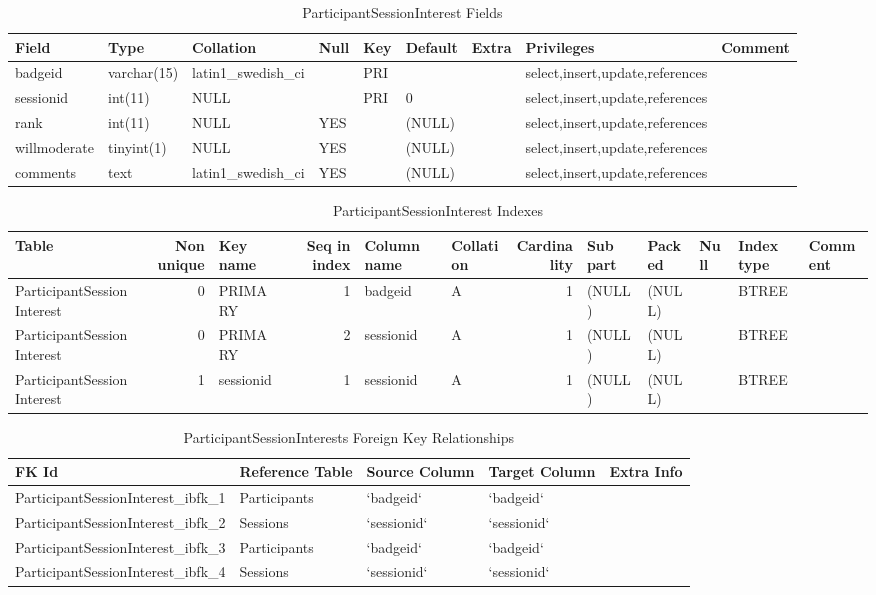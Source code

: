 \documentclass[captions=tablesignature]{scrartcl}
\begin{document}
\begin{table}[htb]
\caption{\label{tbl:participantsessioninterestfields}ParticipantSessionInterest Fields}
\centering
\begin{tabular}{lllllllll}
\hline
Field & Type & Collation & Null & Key & Default & Extra & Privileges & Comment\\
\hline
badgeid & varchar(15) & latin1\_swedish\_ci &  & PRI &  &  & select,insert,update,references & \\
sessionid & int(11) & NULL &  & PRI & 0 &  & select,insert,update,references & \\
rank & int(11) & NULL & YES &  & (NULL) &  & select,insert,update,references & \\
willmoderate & tinyint(1) & NULL & YES &  & (NULL) &  & select,insert,update,references & \\
comments & text & latin1\_swedish\_ci & YES &  & (NULL) &  & select,insert,update,references & \\
\hline
\end{tabular}
\end{table}

\begin{table}[htb]
\caption{\label{tbl:participantsessioninterestindexes}ParticipantSessionInterest Indexes}
\centering
\begin{tabular}{lrlrllrlllll}
\hline
Table & Non unique & Key name & Seq in index & Column name & Collation & Cardinality & Sub part & Packed & Null & Index type & Comment\\
\hline
ParticipantSessionInterest & 0 & PRIMARY & 1 & badgeid & A & 1 & (NULL) & (NULL) &  & BTREE & \\
ParticipantSessionInterest & 0 & PRIMARY & 2 & sessionid & A & 1 & (NULL) & (NULL) &  & BTREE & \\
ParticipantSessionInterest & 1 & sessionid & 1 & sessionid & A & 1 & (NULL) & (NULL) &  & BTREE & \\
\hline
\end{tabular}
\end{table}

\begin{table}[htb]
\caption{\label{tbl:participantsessioninterestsfkr}ParticipantSessionInterests Foreign Key Relationships}
\centering
\begin{tabular}{lllll}
\hline
FK Id & Reference Table & Source Column & Target Column & Extra Info\\
\hline
ParticipantSessionInterest\_ibfk\_1 & Participants & `badgeid` & `badgeid` & \\
ParticipantSessionInterest\_ibfk\_2 & Sessions & `sessionid` & `sessionid` & \\
ParticipantSessionInterest\_ibfk\_3 & Participants & `badgeid` & `badgeid` & \\
ParticipantSessionInterest\_ibfk\_4 & Sessions & `sessionid` & `sessionid` & \\
\hline
\end{tabular}
\end{table}
\end{document}
